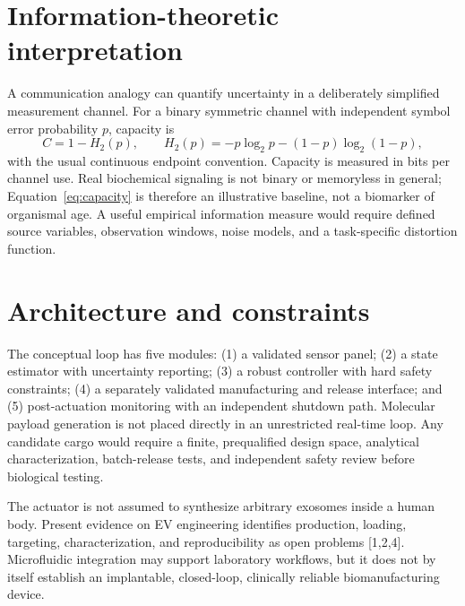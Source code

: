 \documentclass[11pt]{article}
\begin{document}
\section{Information-theoretic interpretation}
A communication analogy can quantify uncertainty in a deliberately simplified measurement channel. For a binary symmetric channel with independent symbol error probability $p$, capacity is
\begin{equation}
C=1-H_2(p),\qquad H_2(p)=-p\log_2p-(1-p)\log_2(1-p),\label{eq:capacity}
\end{equation}
with the usual continuous endpoint convention. Capacity is measured in bits per channel use. Real biochemical signaling is not binary or memoryless in general; Equation~\eqref{eq:capacity} is therefore an illustrative baseline, not a biomarker of organismal age. A useful empirical information measure would require defined source variables, observation windows, noise models, and a task-specific distortion function.

\section{Architecture and constraints}
The conceptual loop has five modules: (1) a validated sensor panel; (2) a state estimator with uncertainty reporting; (3) a robust controller with hard safety constraints; (4) a separately validated manufacturing and release interface; and (5) post-actuation monitoring with an independent shutdown path. Molecular payload generation is not placed directly in an unrestricted real-time loop. Any candidate cargo would require a finite, prequalified design space, analytical characterization, batch-release tests, and independent safety review before biological testing.

The actuator is not assumed to synthesize arbitrary exosomes inside a human body. Present evidence on EV engineering identifies production, loading, targeting, characterization, and reproducibility as open problems [1,2,4]. Microfluidic integration may support laboratory workflows, but it does not by itself establish an implantable, closed-loop, clinically reliable biomanufacturing device.
\end{document}
